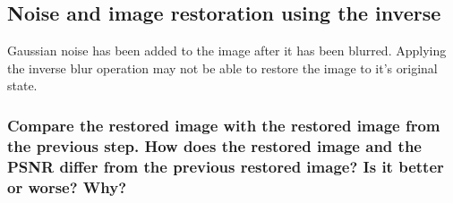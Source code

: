 \documentclass[article, 1.5space, letterpaper, 12pt, oneside, header, footer]{SydeClass}
\begin{document}
\clearpage
\subsection{Noise and image restoration using the inverse}
Gaussian noise has been added to the image after it has been blurred. Applying the inverse blur operation may not be able to restore the image to it's original state.

\begin{figure}[ht]
\centering
\end{figure}


\subsubsection{Compare the restored image with the restored image from the previous step. How does the restored
image and the PSNR differ from the previous restored image? Is it better or worse? Why?}
\end{document}
